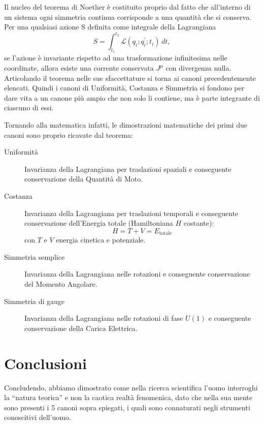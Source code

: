 \documentclass[11pt,a4paper]{article}
\begin{document}
Il nucleo del teorema di Noether è costituito proprio dal fatto che all’interno di un sistema ogni simmetria continua corrisponde a una quantità che si conserva. Per una qualsiasi azione S definita come integrale della Lagrangiana \begin{equation}S=\int_{t_1}^{t_2}\mathcal{L}(q_i;q_i^{\prime};t_i)\,dt,\end{equation} se l’azione è invariante rispetto ad una trasformazione infinitesima nelle coordinate, allora esiste una corrente conservata $J^\mu$ con divergenza nulla. Articolando il teorema nelle sue sfaccettature si torna ai canoni precedentemente elencati. Quindi i canoni di Uniformità, Costanza e Simmetria si fondono per dare vita a un canone più ampio che non solo li contiene, ma è parte integrante di ciascuno di essi. 

Tornando alla matematica infatti, le dimostrazioni matematiche dei primi due canoni sono proprio ricavate dal teorema: \begin{description}
\item[Uniformità] Invarianza della Lagrangiana per traslazioni spaziali e conseguente conservazione della Quantità di Moto.
\item[Costanza] Invarianza della Lagrangiana per traslazioni temporali e conseguente conservazione dell’Energia totale (Hamiltoniana $H$ costante):
\begin{equation}H=T+V=E_{\mathrm{totale}}\end{equation}
con $T$ e $V$ energia cinetica e potenziale.
\item[Simmetria semplice] Invarianza della Lagrangiana nelle rotazioni e conseguente conservazione del Momento Angolare.
\item[Simmetria di gauge] Invarianza della Lagrangiana nelle rotazioni di fase $U(1)$ e conseguente conservazione della Carica Elettrica.
\end{description}

\section{Conclusioni}

Concludendo, abbiamo dimostrato come nella ricerca scientifica l’uomo interroghi la “natura teorica” e non la caotica realtà fenomenica, dato che nella sua mente sono presenti i 5 canoni sopra spiegati, i quali sono connaturati negli strumenti conoscitivi dell’uomo. 
\end{document}
